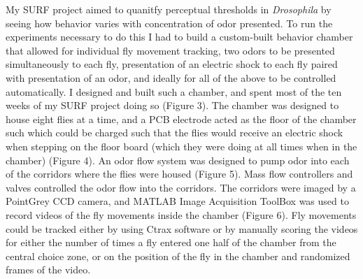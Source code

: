 \documentclass{article}
\begin{document}
My SURF project aimed to quanitfy perceptual thresholds in \textit{Drosophila} by seeing how behavior varies with concentration of odor presented. To run the experiments necessary to do this I had to build a custom-built behavior chamber that allowed for individual fly movement tracking, two odors to be presented simultaneously to each fly, presentation of an electric shock to each fly paired with presentation of an odor, and ideally for all of the above to be controlled automatically. I designed and built such a chamber, and spent most of the ten weeks of my SURF project doing so (Figure 3). The chamber was designed to house eight flies at a time, and a PCB electrode acted as the floor of the chamber such which could be charged such that the flies would receive an electric shock when stepping on the floor board (which they were doing at all times when in the chamber) (Figure 4). An odor flow system was designed to pump odor into each of the corridors where the flies were housed (Figure 5). Mass flow controllers and valves controlled the odor flow into the corridors. The corridors were imaged by a PointGrey CCD camera, and MATLAB Image Acquisition ToolBox was used to record videos of the fly movements inside the chamber (Figure 6). Fly movements could be tracked either by using Ctrax software or by manually scoring the videos for either the number of times a fly entered one half of the chamber from the central choice zone, or on the position of the fly in the chamber and randomized frames of the video.\\
\end{document}
